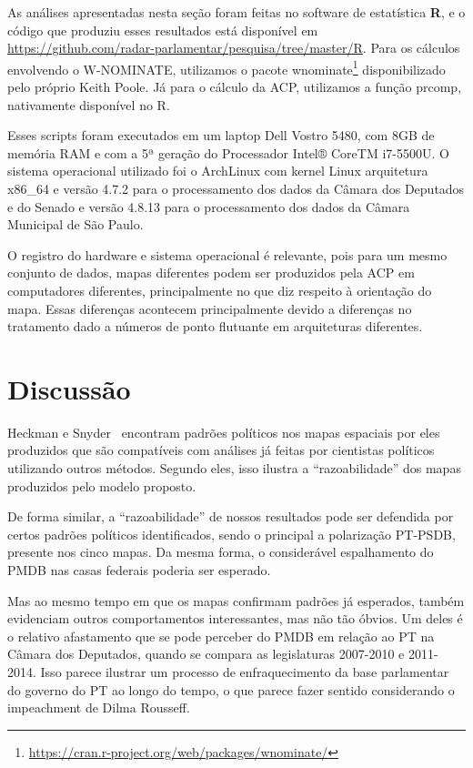 \documentclass[a4paper, 12pt]{article}
\newcommand\wnominate{W-NOMINATE\xspace}
\begin{document}
As análises apresentadas nesta seção foram feitas no software de estatística \textbf{R}, e o código que produziu esses resultados está disponível em \url{https://github.com/radar-parlamentar/pesquisa/tree/master/R}. Para os cálculos envolvendo o \wnominate, utilizamos o pacote \textsf{wnominate}\footnote{\url{https://cran.r-project.org/web/packages/wnominate/}} disponibilizado pelo próprio Keith Poole. Já para o cálculo da ACP, utilizamos a função \textsf{prcomp}, nativamente disponível no R.

Esses scripts foram executados em um laptop Dell Vostro 5480, com 8GB de memória RAM e com a 5ª geração do Processador Intel® CoreTM i7-5500U. O sistema operacional utilizado foi o ArchLinux com kernel Linux arquitetura x86\_64 e versão 4.7.2 para o processamento dos dados da Câmara dos Deputados e do Senado e versão 4.8.13 para o processamento dos dados da Câmara Municipal de São Paulo. 

O registro do hardware e sistema operacional é relevante, pois para um mesmo conjunto de dados, mapas diferentes podem ser produzidos pela ACP em computadores diferentes, principalmente no que diz respeito à orientação do mapa. Essas diferenças acontecem principalmente devido a diferenças no tratamento dado a números de ponto flutuante em arquiteturas diferentes.

\section{Discussão}
\label{sec:discussao}

Heckman e Snyder~\cite{heckman-snyder1997} encontram padrões políticos nos mapas espaciais por eles produzidos que são compatíveis com análises já feitas por cientistas políticos utilizando outros métodos. Segundo eles, isso ilustra a ``razoabilidade'' dos mapas produzidos pelo modelo proposto. 

De forma similar, a ``razoabilidade'' de nossos resultados pode ser defendida por certos padrões políticos identificados, sendo o principal a polarização PT-PSDB, presente nos cinco mapas. Da mesma forma, o considerável espalhamento do PMDB nas casas federais poderia ser esperado.

Mas ao mesmo tempo em que os mapas confirmam padrões já esperados, também evidenciam outros comportamentos interessantes, mas não tão óbvios. Um deles é o relativo afastamento que se pode perceber do PMDB em relação ao PT na Câmara dos Deputados, quando se compara as legislaturas 2007-2010 e 2011-2014. Isso parece ilustrar um processo de enfraquecimento da base parlamentar do governo do PT ao longo do tempo, o que parece fazer sentido considerando o impeachment de Dilma Rousseff.
\end{document}
